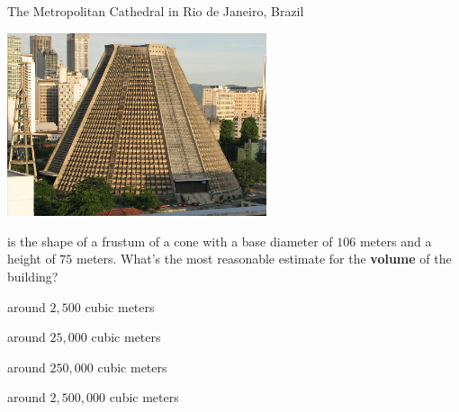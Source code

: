 \documentclass[noauthor,nooutcomes]{ximera}
\begin{document}
\begin{exercise}%
  The Metropolitan Cathedral in Rio de Janeiro, Brazil
  \begin{center}
    \includegraphics[width=3in]{CatedralMetropolitanaRiodeJaneiro.jpg}
  \end{center}  
  is the shape of a frustum of a cone with a base diameter of $106$
  meters and a height of $75$ meters. What's the most reasonable
  estimate for the \textbf{volume} of the building?
    \begin{enumerate}\begin{multicols}{2}
    \item around $2,500$ cubic meters
    \item around $25,000$ cubic meters
    \item around $250,000$ cubic meters %
    \item around $2,500,000$ cubic meters
    \end{multicols}
  \end{enumerate}
\end{exercise}
\end{document}
